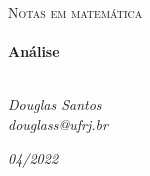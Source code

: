\begin{titlepage}
   \begin{center}
      \textsc{\Large Notas em matemática}\\[0.5cm]

      \LinhaR \\[0.4cm]
         { \LARGE \bfseries Análise \\[0.4cm]}
      \LinhaR \\[1.4cm]

      \noindent
      \begin{minipage}{0.4\textwidth}
         \begin{center} \large
            \emph{Douglas Santos}\\
            \itshape{douglass@ufrj.br}
         \end{center}
      \end{minipage}

      \begin{center}
      \end{center}
      \vfill
      {\large \textit{04/2022}}
   \end{center}
\end{titlepage}
\clearpage